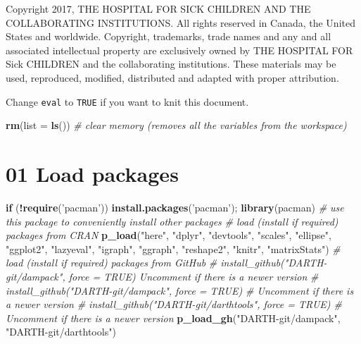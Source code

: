 \documentclass[
]{article}
\newenvironment{Shaded}{\begin{snugshade}}{\end{snugshade}}
\newcommand{\CommentTok}[1]{\textcolor[rgb]{0.56,0.35,0.01}{\textit{#1}}}
\newcommand{\ControlFlowTok}[1]{\textcolor[rgb]{0.13,0.29,0.53}{\textbf{#1}}}
\newcommand{\DataTypeTok}[1]{\textcolor[rgb]{0.13,0.29,0.53}{#1}}
\newcommand{\KeywordTok}[1]{\textcolor[rgb]{0.13,0.29,0.53}{\textbf{#1}}}
\newcommand{\NormalTok}[1]{#1}
\newcommand{\OperatorTok}[1]{\textcolor[rgb]{0.81,0.36,0.00}{\textbf{#1}}}
\newcommand{\StringTok}[1]{\textcolor[rgb]{0.31,0.60,0.02}{#1}}
\begin{document}
Copyright 2017, THE HOSPITAL FOR SICK CHILDREN AND THE COLLABORATING
INSTITUTIONS. All rights reserved in Canada, the United States and
worldwide. Copyright, trademarks, trade names and any and all associated
intellectual property are exclusively owned by THE HOSPITAL FOR Sick
CHILDREN and the collaborating institutions. These materials may be
used, reproduced, modified, distributed and adapted with proper
attribution.

\newpage

Change \texttt{eval} to \texttt{TRUE} if you want to knit this document.

\begin{Shaded}
\begin{Highlighting}[]
\KeywordTok{rm}\NormalTok{(}\DataTypeTok{list =} \KeywordTok{ls}\NormalTok{())      }\CommentTok{# clear memory (removes all the variables from the workspace)}
\end{Highlighting}
\end{Shaded}

\hypertarget{load-packages}{%
\section{01 Load packages}\label{load-packages}}

\begin{Shaded}
\begin{Highlighting}[]
\ControlFlowTok{if}\NormalTok{ (}\OperatorTok{!}\KeywordTok{require}\NormalTok{(}\StringTok{'pacman'}\NormalTok{)) }\KeywordTok{install.packages}\NormalTok{(}\StringTok{'pacman'}\NormalTok{); }\KeywordTok{library}\NormalTok{(pacman) }\CommentTok{# use this package to conveniently install other packages}
\CommentTok{# load (install if required) packages from CRAN}
\KeywordTok{p_load}\NormalTok{(}\StringTok{"here"}\NormalTok{, }\StringTok{"dplyr"}\NormalTok{, }\StringTok{"devtools"}\NormalTok{, }\StringTok{"scales"}\NormalTok{, }\StringTok{"ellipse"}\NormalTok{, }\StringTok{"ggplot2"}\NormalTok{, }\StringTok{"lazyeval"}\NormalTok{, }\StringTok{"igraph"}\NormalTok{, }\StringTok{"ggraph"}\NormalTok{, }\StringTok{"reshape2"}\NormalTok{, }\StringTok{"knitr"}\NormalTok{, }\StringTok{"matrixStats"}\NormalTok{)                                               }
\CommentTok{# load (install if required) packages from GitHub}
\CommentTok{# install_github("DARTH-git/dampack", force = TRUE) Uncomment if there is a newer version}
\CommentTok{# install_github("DARTH-git/dampack", force = TRUE) # Uncomment if there is a newer version}
\CommentTok{# install_github("DARTH-git/darthtools", force = TRUE) # Uncomment if there is a newer version}
\KeywordTok{p_load_gh}\NormalTok{(}\StringTok{"DARTH-git/dampack"}\NormalTok{, }\StringTok{"DARTH-git/darthtools"}\NormalTok{)}
\end{Highlighting}
\end{Shaded}
\end{document}
